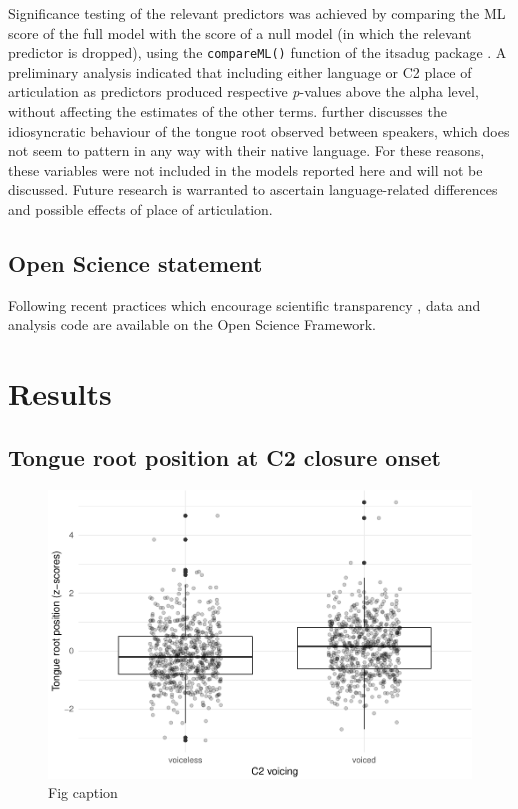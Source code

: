 \documentclass[12pt,]{article}
\begin{document}
Significance testing of the relevant predictors was achieved by
comparing the ML score of the full model with the score of a null model
(in which the relevant predictor is dropped), using the
\texttt{compareML()} function of the itsadug package
\citep{van-rij2017}. A preliminary analysis indicated that including
either language or C2 place of articulation as predictors produced
respective \emph{p}-values above the alpha level, without affecting the
estimates of the other terms.  further discusses the
idiosyncratic behaviour of the tongue root observed between speakers,
which does not seem to pattern in any way with their native language.
For these reasons, these variables were not included in the models
reported here and will not be discussed. Future research is warranted to
ascertain language-related differences and possible effects of place of
articulation.

\hypertarget{open-science-statement}{%
\subsection{Open Science statement}\label{open-science-statement}}

Following recent practices which encourage scientific transparency
\citep{cruwell2018, berez-kroeker2018, roettger2019}, data and analysis
code are available on the Open Science Framework.

\hypertarget{results}{%
\section{Results}\label{results}}

\label{s:results}

\hypertarget{tongue-root-position-at-c2-closure-onset}{%
\subsection{Tongue root position at C2 closure
onset}\label{tongue-root-position-at-c2-closure-onset}}

\begin{figure}
\includegraphics[width=\linewidth]{2018-tra_files/figure-latex/trp-z-box-1} \caption{Fig caption}\label{f:trp-z-box}
\end{figure}
\end{document}

